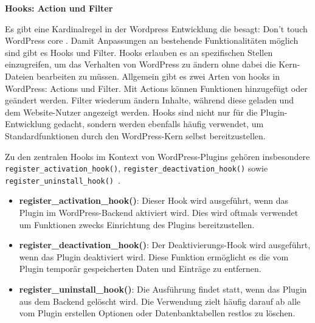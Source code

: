 \newpage
\textbf{Hooks: Action und Filter}

Es gibt eine Kardinalregel in der Wordpress Entwicklung die besagt: Don’t touch WordPress core \cite{wordpress2024Intro}. %
Damit Anpassungen an bestehende Funktionalitäten möglich sind gibt es Hooks und Filter.
Hooks erlauben es an spezifischen Stellen einzugreifen, um das Verhalten von WordPress zu ändern ohne dabei die Kern-Dateien bearbeiten zu müssen.
Allgemein gibt es zwei Arten von hooks in WordPress: Actions und Filter.
Mit Actions können Funktionen hinzugefügt oder geändert werden.
Filter wiederum ändern Inhalte, während diese geladen und dem Website-Nutzer angezeigt werden.
Hooks sind nicht nur für die Plugin-Entwicklung gedacht, sondern werden ebenfalls häufig verwendet, um Standardfunktionen durch den WordPress-Kern selbst bereitzustellen.

Zu den zentralen Hooks im Kontext von WordPress-Plugins gehören insbesondere \texttt{register\_activation\_hook()}, \texttt{register\_deactivation\_hook()} sowie \\ \texttt{register\_uninstall\_hook()}~\cite{wordpress2024ActionsHooks}.

\begin{itemize}
 \item \textbf{register\_activation\_hook()}: Dieser Hook wird ausgeführt, wenn das Plugin im WordPress-Backend aktiviert wird. Dies wird oftmals verwendet um Funktionen zwecks Einrichtung des Plugins bereitzustellen.
 \item \textbf{register\_deactivation\_hook()}: Der Deaktivierungs-Hook wird ausgeführt, wenn das Plugin deaktiviert wird. Diese Funktion ermöglicht es die vom Plugin temporär gespeicherten Daten und Einträge zu entfernen.
 \item \textbf{register\_uninstall\_hook()}: Die Ausführung findet statt, wenn das Plugin aus dem Backend gelöscht wird. Die Verwendung zielt häufig darauf ab alle vom Plugin erstellen Optionen oder Datenbanktabellen restlos zu löschen.
\end{itemize}






